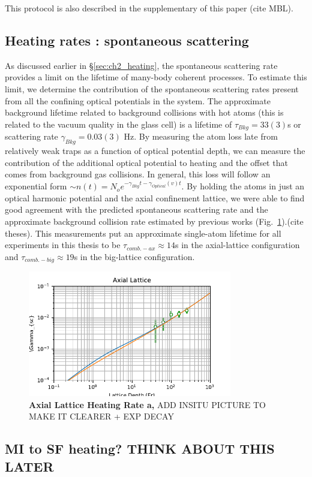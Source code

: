 This protocol is also described in the supplementary of this paper (cite MBL).

\subsection{Heating rates : spontaneous scattering}

As discussed earlier in \S \ref{sec:ch2_heating}, the spontaneous scattering rate provides a limit on the lifetime of many-body coherent processes. To estimate this limit, we determine the contribution of the spontaneous scattering rates present from all the confining optical potentials in the system. The approximate background lifetime related to background collisions with hot atoms (this is related to the vacuum quality in the glass cell) is a lifetime of $\tau_{Bkg} = 33(3)$s or scattering rate $\gamma_{Bkg} = 0.03(3)$ Hz. By measuring the atom loss late from relatively weak traps as a function of optical potential depth, we can measure the contribution of the additional optical potential to heating and the offset that comes from background gas collisions. In general, this loss will follow an exponential form $\sim n(t) = N_o e^{-\gamma_{Bkg} t - \gamma_{Optical}(v) t}$. By holding the atoms in just an optical harmonic potential and the axial confinement lattice, we were able to find good agreement with the predicted spontaneous scattering rate and the approximate background collision rate estimated by previous works (Fig.~\ref{fig:heatingCal}).(cite theses). This measurements put an approximate single-atom lifetime for all experiments in this thesis to be $\tau_{comb.-ax} \approx 14$s in the axial-lattice configuration and $\tau_{comb.-big} \approx 19$s in the big-lattice configuration.

\begin{figure}[h!]
		\includegraphics[width=3.5in]{figures/ch2/heating_rates/ScatteringRatesCal.pdf} 
		\caption{\textbf{Axial Lattice Heating Rate a,}   ADD INSITU PICTURE TO MAKE IT CLEARER + EXP DECAY}
		\label{fig:heatingCal}	
\end{figure}

\subsection{MI to SF heating? THINK ABOUT THIS LATER}


